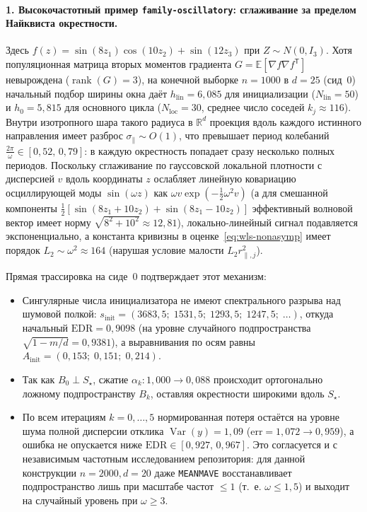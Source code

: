 \documentclass[11pt,a4paper]{article}
\numberwithin{equation}{section}
\theoremstyle{definition}
\theoremstyle{remark}
\newcommand{\R}{\mathbb{R}}
\newcommand{\E}{\mathbb{E}}
\newcommand{\Var}{\operatorname{Var}}
\newcommand{\rank}{\operatorname{rank}}
\newcommand{\T}{^{\mathsf T}}
\begin{document}
\paragraph{1. Высокочастотный пример \texttt{family-oscillatory}: сглаживание за пределом Найквиста окрестности.}
Здесь $f(z) = \sin(8 z_1)\cos(10 z_2) + \sin(12 z_3)$ при $Z \sim N(0, I_3)$.
Хотя популяционная матрица вторых моментов градиента $G = \E[\nabla f \nabla f\T]$ невырождена
($\rank(G) = 3$), на конечной выборке $n = 1000$ в $d = 25$ (сид~0) начальный подбор ширины окна
даёт $h_{\mathrm{lin}} = 6{,}085$ для инициализации ($N_{\mathrm{lin}} = 50$) и $h_0 = 5{,}815$ для
основного цикла ($N_{\mathrm{loc}} = 30$, среднее число соседей $k_j \approx 116$).
Внутри изотропного шара такого радиуса в $\R^d$ проекция вдоль каждого истинного направления
имеет разброс $\sigma_\parallel \sim O(1)$, что превышает период колебаний $\frac{2\pi}{\omega} \in [0{,}52,\, 0{,}79]$:
в каждую окрестность попадает сразу несколько полных периодов.
Поскольку сглаживание по гауссовской локальной плотности с дисперсией $v$ вдоль координаты $z$
ослабляет линейную ковариацию осциллирующей моды $\sin(\omega z)$ как $\omega v \exp(-\frac{1}{2}\omega^2 v)$
(а для смешанной компоненты $\frac{1}{2}[\sin(8 z_1 + 10 z_2) + \sin(8 z_1 - 10 z_2)]$ эффективный
волновой вектор имеет норму $\sqrt{8^2 + 10^2} \approx 12{,}81$), локально-линейный сигнал подавляется экспоненциально,
а константа кривизны в оценке~\eqref{eq:wls-nonasymp} имеет порядок $L_2 \sim \omega^2 \approx 164$
(нарушая условие малости $L_2 r_{\parallel, j}^2$).

Прямая трассировка на сиде~0 подтверждает этот механизм:
\begin{itemize}
  \item Сингулярные числа инициализатора не имеют спектрального разрыва над шумовой полкой:
  $s_{\mathrm{init}} = (3683{,}5;\; 1531{,}5;\; 1293{,}5;\; 1247{,}5;\; \dots)$, откуда начальный
  $\mathrm{EDR} = 0{,}9098$ (на уровне случайного подпространства $\sqrt{1 - m/d} = 0{,}9381$),
  а выравнивания по осям равны $A_{\mathrm{init}} = (0{,}153;\; 0{,}151;\; 0{,}214)$.
  \item Так как $B_0 \perp S_\star$, сжатие $\alpha_k : 1{,}000 \to 0{,}088$ происходит ортогонально
  ложному подпространству $B_k$, оставляя окрестности широкими вдоль $S_\star$.
  \item По всем итерациям $k = 0,\dots,5$ нормированная потеря остаётся на уровне шума полной
  дисперсии отклика $\Var(y) = 1{,}09$ ($\mathrm{err} = 1{,}072 \to 0{,}959$), а ошибка не опускается
  ниже $\mathrm{EDR} \in [0{,}927,\, 0{,}967]$. Это согласуется и с независимым частотным исследованием
  репозитория: для данной конструкции $n=2000, d=20$ даже \texttt{MEANMAVE} восстанавливает подпространство
  лишь при масштабе частот $\le 1$ (т.~е. $\omega \le 1{,}5$) и выходит на случайный уровень при $\omega \ge 3$.
\end{itemize}
\end{document}
